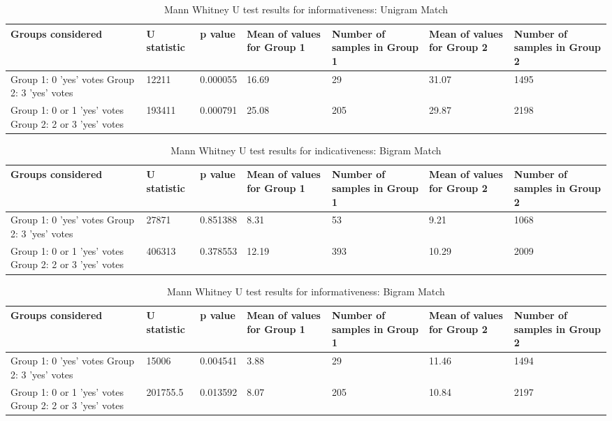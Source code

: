 \begin{table}[!htbp]
\caption{Mann Whitney U test results for informativeness: Unigram Match}
\centering
\label{tab:unicorr2}
\begin{tabular}{|p{}|p{}|p{}|p{}|p{}|p{}|p{}|}
\hline
Groups considered    & U statistic & p value & Mean of values for Group 1 & Number of samples in Group 1 & Mean of values for Group 2 & Number of samples in Group 2\\ \hline
Group 1: 0 'yes' votes \newline Group 2: 3 'yes' votes & 12211 & 0.000055  & 16.69 & 29 & 31.07 & 1495  \\ \hline
Group 1: 0 or 1 'yes' votes \newline Group 2: 2 or 3 'yes' votes & 193411 & 0.000791 & 25.08 & 205 & 29.87 & 2198 \\ \hline
\end{tabular}
\end{table}

\begin{table}[!htbp]
\caption{Mann Whitney U test results for indicativeness: Bigram Match}
\centering
\label{tab:bicorr1}
\begin{tabular}{|p{}|p{}|p{}|p{}|p{}|p{}|p{}|}
\hline
Groups considered    & U statistic & p value & Mean of values for Group 1 & Number of samples in Group 1 & Mean of values for Group 2 & Number of samples in Group 2\\ \hline
Group 1: 0 'yes' votes \newline Group 2: 3 'yes' votes & 27871 & 0.851388 & 8.31 & 53 & 9.21 & 1068  \\ \hline
Group 1: 0 or 1 'yes' votes \newline Group 2: 2 or 3 'yes' votes& 406313 & 0.378553 & 12.19 & 393 & 10.29 & 2009 \\ \hline
\end{tabular}
\end{table}

\begin{table}[!htbp]
\caption{Mann Whitney U test results for informativeness: Bigram Match}
\centering
\label{tab:bicorr2}
\begin{tabular}{|p{}|p{}|p{}|p{}|p{}|p{}|p{}|}
\hline
Groups considered    & U statistic & p value & Mean of values for Group 1 & Number of samples in Group 1 & Mean of values for Group 2 & Number of samples in Group 2\\ \hline
Group 1: 0 'yes' votes \newline Group 2: 3 'yes' votes & 15006 & 0.004541 & 3.88 & 29 & 11.46 & 1494  \\ \hline
Group 1: 0 or 1 'yes' votes \newline Group 2: 2 or 3 'yes' votes & 201755.5 & 0.013592 & 8.07 & 205 & 10.84 & 2197 \\ \hline
\end{tabular}
\end{table}



